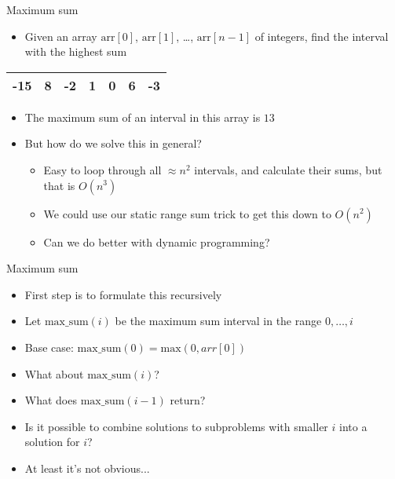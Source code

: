 \begin{frame}[fragile]{Maximum sum}

    \begin{itemize}
\item Given an array $\mathrm{arr}[0]$, $\mathrm{arr}[1]$, \ldots, $\mathrm{arr}[n-1]$ of integers, find the interval with the highest sum
    \end{itemize}

    \begin{center}
        \begin{tabular}{|c|c|c|c|c|c|c|}
            \hline
						-15 & 8 & -2 & 1 & 0 & 6 & -3 \\
            \hline
        \end{tabular}
    \end{center}

    \begin{itemize}
        \item The maximum sum of an interval in this array is $13$

        \item But how do we solve this in general?
            \begin{itemize}
        \item Easy to loop through all $\approx n^2$ intervals, and calculate their sums, but that is $O(n^3)$
        \item We could use our static range sum trick to get this down to $O(n^2)$
        \item Can we do better with dynamic programming?
            \end{itemize}
    \end{itemize}

\end{frame}

\begin{frame}[fragile]{Maximum sum}

    \begin{itemize}
        \item First step is to formulate this recursively
        \item Let $\mathrm{max\_{}sum}(i)$ be the maximum sum interval in the range $0,\ldots,i$
        \item Base case: $\mathrm{max\_{}sum}(0) = \mathrm{max}(0, arr[0])$
        \item What about $\mathrm{max\_{}sum}(i)$?
        \item What does $\mathrm{max\_{}sum}(i-1)$ return?
        \item Is it possible to combine solutions to subproblems with smaller $i$ into a solution for $i$?
        \item At least it's not obvious...
    \end{itemize}

\end{frame}

